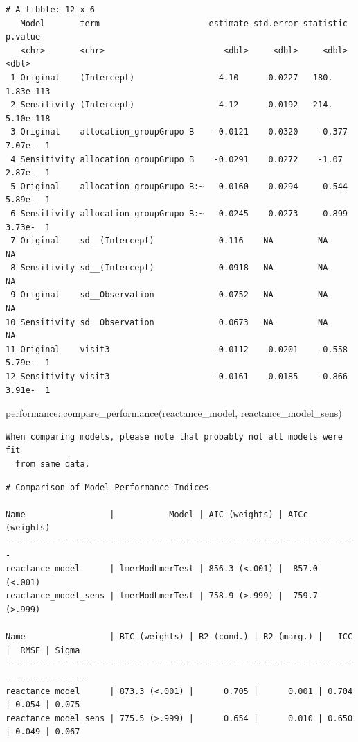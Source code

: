 \documentclass[
  letterpaper,
  DIV=11,
  numbers=noendperiod]{scrartcl}
\newenvironment{Shaded}{\begin{snugshade}}{\end{snugshade}}
\newcommand{\FunctionTok}[1]{\textcolor[rgb]{0.28,0.35,0.67}{#1}}
\newcommand{\NormalTok}[1]{\textcolor[rgb]{0.00,0.23,0.31}{#1}}
\newcommand{\SpecialCharTok}[1]{\textcolor[rgb]{0.37,0.37,0.37}{#1}}
\begin{document}
\begin{verbatim}
# A tibble: 12 x 6
   Model       term                      estimate std.error statistic    p.value
   <chr>       <chr>                        <dbl>     <dbl>     <dbl>      <dbl>
 1 Original    (Intercept)                 4.10      0.0227   180.     1.83e-113
 2 Sensitivity (Intercept)                 4.12      0.0192   214.     5.10e-118
 3 Original    allocation_groupGrupo B    -0.0121    0.0320    -0.377  7.07e-  1
 4 Sensitivity allocation_groupGrupo B    -0.0291    0.0272    -1.07   2.87e-  1
 5 Original    allocation_groupGrupo B:~   0.0160    0.0294     0.544  5.89e-  1
 6 Sensitivity allocation_groupGrupo B:~   0.0245    0.0273     0.899  3.73e-  1
 7 Original    sd__(Intercept)             0.116    NA         NA     NA        
 8 Sensitivity sd__(Intercept)             0.0918   NA         NA     NA        
 9 Original    sd__Observation             0.0752   NA         NA     NA        
10 Sensitivity sd__Observation             0.0673   NA         NA     NA        
11 Original    visit3                     -0.0112    0.0201    -0.558  5.79e-  1
12 Sensitivity visit3                     -0.0161    0.0185    -0.866  3.91e-  1
\end{verbatim}

\begin{Shaded}
\begin{Highlighting}[]
\NormalTok{performance}\SpecialCharTok{::}\FunctionTok{compare\_performance}\NormalTok{(reactance\_model, reactance\_model\_sens)}
\end{Highlighting}
\end{Shaded}

\begin{verbatim}
When comparing models, please note that probably not all models were fit
  from same data.
\end{verbatim}

\begin{verbatim}
# Comparison of Model Performance Indices

Name                 |           Model | AIC (weights) | AICc (weights)
-----------------------------------------------------------------------
reactance_model      | lmerModLmerTest | 856.3 (<.001) |  857.0 (<.001)
reactance_model_sens | lmerModLmerTest | 758.9 (>.999) |  759.7 (>.999)

Name                 | BIC (weights) | R2 (cond.) | R2 (marg.) |   ICC |  RMSE | Sigma
--------------------------------------------------------------------------------------
reactance_model      | 873.3 (<.001) |      0.705 |      0.001 | 0.704 | 0.054 | 0.075
reactance_model_sens | 775.5 (>.999) |      0.654 |      0.010 | 0.650 | 0.049 | 0.067
\end{verbatim}
\end{document}
